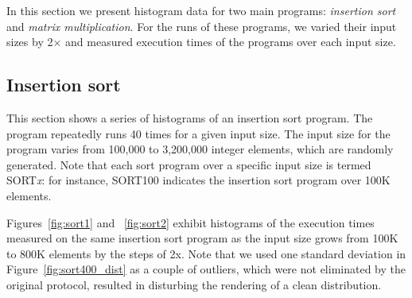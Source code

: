 \documentclass[10pt]{article}
\begin{document}
In this section we present histogram data 
for two main programs: {\it insertion sort} and {\it matrix multiplication}. 
For the runs of these programs, we varied their input sizes by 2{\small $\times$} 
and measured execution times of the programs over each input size. 

\subsection{Insertion sort~\label{sec:sort}} 
This section shows a series of histograms of an insertion sort program. 
The program repeatedly runs 40 times for a given input size. 
The input size for the program 
varies from 100,000 to 3,200,000 integer elements, which are randomly generated. 
Note that each sort program over a specific input size is termed SORT{\it x}: 
for instance, SORT100 indicates the insertion sort program over 100K elements. 

Figures~\ref{fig:sort1} and ~\ref{fig:sort2} exhibit 
histograms of the execution times measured on the same insertion sort program as 
the input size grows from 100K to 800K elements by the steps of 2x. 
Note that we used one standard deviation in Figure~\ref{fig:sort400_dist} as
a couple of outliers, which were not eliminated by the original protocol, 
resulted in disturbing the rendering of a clean distribution. 
\end{document}
